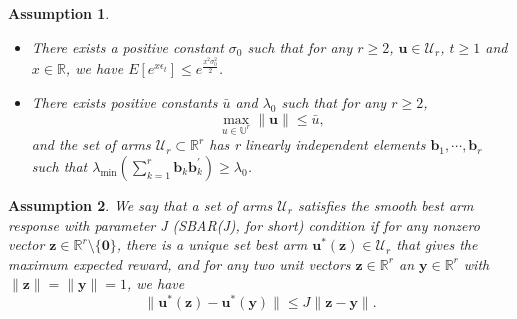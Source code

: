 \documentclass{article}
\theoremstyle{plain}
\newtheorem{assumption}{Assumption}
\theoremstyle{definition}
\begin{document}
\begin{assumption}
\begin{itemize}
\item There exists a positive constant $\sigma_{0}$ such that for any $r\geq 2$, $\textbf{u}\in \mathcal{U}_{r}$, $t\geq 1$ and $x\in \mathbb{R}$, we have $E[e^{x \epsilon_{t}}]\leq e^{\frac{x^{2}\sigma_{0}^{2}}{2}}$.
\item There exists positive constants $\bar{u}$ and $\lambda_{0}$ such that for any $r\geq 2$,
\begin{equation}
\max_{u\in \mathbb{U}^{r}}\|\textbf{u}\|\leq \bar{u}, \nonumber
\end{equation}
and the set of arms $\mathcal{U}_{r}\subset 
\mathbb{R}^{r}$ has r linearly independent elements $\textbf{b}_{1},\cdots,\textbf{b}_{r}$ such that $\lambda_{\min}(\sum_{k=1}^{r}\textbf{b}_{k}\textbf{b}_{k}^{'})\geq \lambda_{0}$.
\end{itemize}
\end{assumption}



\begin{assumption}
We say that a set of arms $\mathcal{U}_{r}$ satisfies the smooth best arm response with parameter J (SBAR(J), for short) condition if for any nonzero vector $\textbf{z}\in \mathbb{R}^{r}\setminus\{\textbf{0}\}$, there is a unique set best arm $\textbf{u}^{*}(\textbf{z})\in \mathcal{U}_{r}$ that gives the maximum expected reward, and for any two unit vectors $\textbf{z}\in \mathbb{R}^{r}$ an $\textbf{y}\in \mathbb{R}^{r}$ with $\|\textbf{z}\|=\|\textbf{y}\|=1$, we have
\begin{equation}
\|\textbf{u}^{*}(\textbf{z})-\textbf{u}^{*}(\textbf{y})\|\leq J \|\textbf{z}-\textbf{y}\|. \nonumber 
\end{equation}
\end{assumption}
\end{document}
